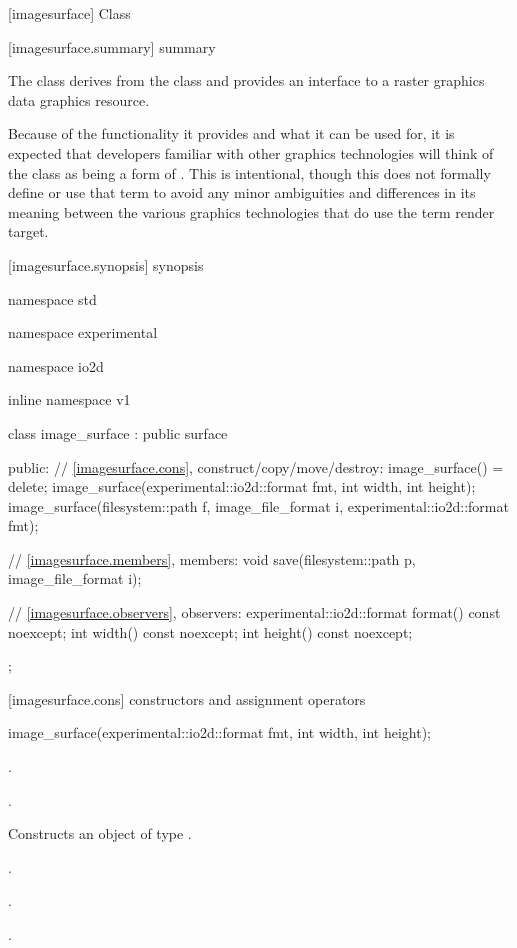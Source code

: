  [imagesurface] {Class }

 [imagesurface.summary] { summary}

\pnum
{}
The class  derives from the  class and provides an interface to a raster graphics data graphics resource.

\pnum
\begin{note}
Because of the functionality it provides and what it can be used for, it is expected that developers familiar with other graphics technologies will think of the  class as being a form of . This is intentional, though this \documenttypename{} does not formally define or use that term to avoid any minor ambiguities and differences in its meaning between the various graphics technologies that do use the term render target.
\end{note}

 [imagesurface.synopsis] { synopsis}

\begin{codeblock}
namespace std { namespace experimental { namespace io2d { inline namespace v1 {
  class image_surface : public surface {
  public:
    // \ref{imagesurface.cons}, construct/copy/move/destroy:
    image_surface() = delete;
    image_surface(experimental::io2d::format fmt, int width, int height);
    image_surface(filesystem::path f, image_file_format i, 
      experimental::io2d::format fmt);
    
    // \ref{imagesurface.members}, members:
    void save(filesystem::path p, image_file_format i);
    
    // \ref{imagesurface.observers}, observers:
    experimental::io2d::format format() const noexcept;
    int width() const noexcept;
    int height() const noexcept;
  };
} } } }
\end{codeblock}

 [imagesurface.cons] { constructors and assignment operators}

\begin{itemdecl}
image_surface(experimental::io2d::format fmt, int width, int height);
\end{itemdecl}
\begin{itemdescr}
\pnum
\requires
{}.

\pnum
{}.

\pnum
\effects
Constructs an object of type .

\pnum
\postconditions
{}.

\pnum
{}.

\pnum
{}.
\end{itemdescr}

